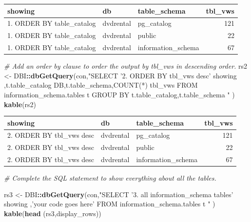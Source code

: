 \documentclass[]{book}
\newenvironment{Shaded}{\begin{snugshade}}{\end{snugshade}}
\newcommand{\CommentTok}[1]{\textcolor[rgb]{0.56,0.35,0.01}{\textit{#1}}}
\newcommand{\KeywordTok}[1]{\textcolor[rgb]{0.13,0.29,0.53}{\textbf{#1}}}
\newcommand{\NormalTok}[1]{#1}
\newcommand{\OperatorTok}[1]{\textcolor[rgb]{0.81,0.36,0.00}{\textbf{#1}}}
\newcommand{\StringTok}[1]{\textcolor[rgb]{0.31,0.60,0.02}{#1}}
\theoremstyle{definition}
\theoremstyle{definition}
\theoremstyle{definition}
\theoremstyle{remark}
\begin{document}
\begin{tabular}{l|l|l|r}
\hline
showing & db & table\_schema & tbl\_vws\\
\hline
1. ORDER BY table\_catalog & dvdrental & pg\_catalog & 121\\
\hline
1. ORDER BY table\_catalog & dvdrental & public & 22\\
\hline
1. ORDER BY table\_catalog & dvdrental & information\_schema & 67\\
\hline
\end{tabular}

\begin{Shaded}
\begin{Highlighting}[]
\CommentTok{# Add an order by clause to order the output by tbl_vws in descending order.}
\NormalTok{rs2 <-}\StringTok{ }\NormalTok{DBI}\OperatorTok{::}\KeywordTok{dbGetQuery}\NormalTok{(con,}\StringTok{"SELECT '2. ORDER BY tbl_vws desc' showing}
\StringTok{                                  ,t.table_catalog DB,t.table_schema,COUNT(*) tbl_vws }
\StringTok{                              FROM information_schema.tables t}
\StringTok{                            GROUP BY t.table_catalog,t.table_schema}
\StringTok{                            "}
\NormalTok{                      )}
\KeywordTok{kable}\NormalTok{(rs2)}
\end{Highlighting}
\end{Shaded}

\begin{tabular}{l|l|l|r}
\hline
showing & db & table\_schema & tbl\_vws\\
\hline
2. ORDER BY tbl\_vws desc & dvdrental & pg\_catalog & 121\\
\hline
2. ORDER BY tbl\_vws desc & dvdrental & public & 22\\
\hline
2. ORDER BY tbl\_vws desc & dvdrental & information\_schema & 67\\
\hline
\end{tabular}

\begin{Shaded}
\begin{Highlighting}[]
\CommentTok{# Complete the SQL statement to show everything about all the tables.}

\NormalTok{rs3 <-}\StringTok{ }\NormalTok{DBI}\OperatorTok{::}\KeywordTok{dbGetQuery}\NormalTok{(con,}\StringTok{"SELECT '3. all information_schema tables' showing}
\StringTok{                                  ,'your code goes here' }
\StringTok{                              FROM information_schema.tables t}
\StringTok{                            "}
\NormalTok{                      )}
\KeywordTok{kable}\NormalTok{(}\KeywordTok{head}\NormalTok{ (rs3,display_rows))}
\end{Highlighting}
\end{Shaded}
\end{document}

